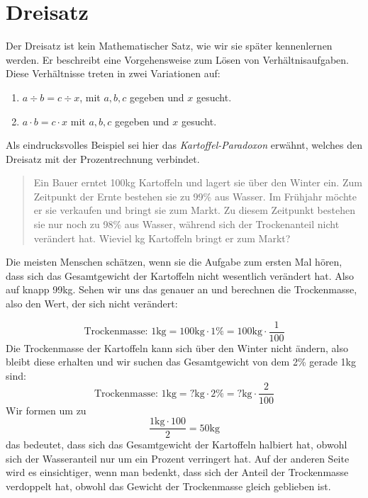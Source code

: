 \section{Dreisatz}

Der Dreisatz ist kein Mathematischer Satz, wie wir sie später kennenlernen werden. Er beschreibt eine Vorgehensweise zum Lösen von Verhältnisaufgaben. Diese Verhältnisse treten in zwei Variationen auf:

\begin{enumerate}
\item $a\div b = c\div x$, mit $a,b,c$ gegeben und $x$ gesucht.
\item $a\cdot b = c\cdot x$ mit $a,b,c$ gegeben und $x$ gesucht.
\end{enumerate}

Als eindrucksvolles Beispiel sei hier das \emph{Kartoffel-Paradoxon} erwähnt, welches den Dreisatz mit der Prozentrechnung verbindet. 

\begin{quote}
Ein Bauer erntet 100kg Kartoffeln und lagert sie über den Winter ein. Zum Zeitpunkt der Ernte bestehen sie zu 99\% aus Wasser. Im Frühjahr möchte er sie verkaufen und bringt sie zum Markt. Zu diesem Zeitpunkt bestehen sie nur noch zu 98\% aus Wasser, während sich der Trockenanteil nicht verändert hat. Wieviel kg Kartoffeln bringt er zum Markt?
\end{quote}

Die meisten Menschen schätzen, wenn sie die Aufgabe zum ersten Mal hören, dass sich das Gesamtgewicht der Kartoffeln nicht wesentlich verändert hat. Also auf knapp 99kg. Sehen wir uns das genauer an und berechnen die Trockenmasse, also den Wert, der sich nicht verändert:

\begin{equation}\label{eq:3satz1}
\text{Trockenmasse: } 1\text{kg} = 100\text{kg} \cdot 1\% = 100\text{kg} \cdot \frac{1}{100}
\end{equation}
Die Trockenmasse der Kartoffeln kann sich über den Winter nicht ändern, also bleibt diese erhalten und wir suchen das Gesamtgewicht von dem 2\% gerade 1kg sind:
\begin{equation}
\text{Trockenmasse: } 1\text{kg} = ?\text{kg} \cdot 2\% = ?\text{kg} \cdot \frac{2}{100}
\end{equation}
Wir formen um zu 
\begin{equation}\label{eq:3satz3}
\frac{1\text{kg}\cdot 100}{2} = 50\text{kg}
\end{equation}
das bedeutet, dass sich das Gesamtgewicht der Kartoffeln halbiert hat, obwohl sich der Wasseranteil nur um ein Prozent verringert hat. Auf der anderen Seite wird es einsichtiger, wenn man bedenkt, dass sich der Anteil der Trockenmasse verdoppelt hat, obwohl das Gewicht der Trockenmasse gleich geblieben ist.

